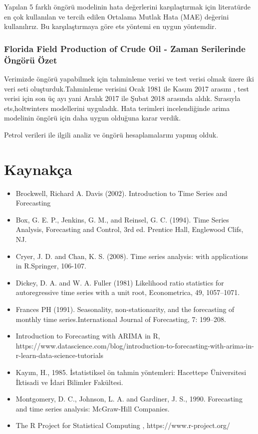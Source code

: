 \documentclass[11pt]{article}
\providecommand{\tightlist}{%
      \setlength{\itemsep}{0pt}\setlength{\parskip}{0pt}}
\begin{document}
    
    Yapılan 5 farklı öngörü modelinin hata değerlerini karşılaştırmak için
literatürde en çok kullanılan ve tercih edilen Ortalama Mutlak Hata
(MAE) değerini kullanılırız. Bu karşılaştırmaya göre ets yöntemi en
uygun yöntemdir.

    \subsubsection{Florida Field Production of Crude Oil - Zaman Serilerinde Öngörü Özet}\label{florida-field-production-of-crude-oil---zaman-serilerinde-uxf6nguxf6ruxfc-uxf6zet}

Verimizde öngörü yapabilmek için tahminleme verisi ve test verisi olmak
üzere iki veri seti oluşturduk.Tahminleme verisini Ocak 1981 ile Kasım
2017 arasını , test verisi için son üç ayı yani Aralık 2017 ile Şubat
2018 arasında aldık. Sırasıyla ets,holtwinters modellerini uyguladık. Hata terimleri incelendiğinde arima modelinin öngörü için daha uygun olduğuna karar verdik.

    Petrol verileri ile ilgili analiz ve öngörü hesaplamalarını yapmış olduk.
\pagebreak
    \section{Kaynakça}\label{kaynakuxe7a}

\begin{itemize}
\tightlist
\item
  Brockwell, Richard A. Davis (2002). Introduction to Time Series and
  Forecasting
\item
  Box, G. E. P., Jenkins, G. M., and Reinsel, G. C. (1994). Time Series
  Analysis, Forecasting and Control, 3rd ed. Prentice Hall, Englewood
  Clifs, NJ.
\item
  Cryer, J. D. and Chan, K. S. (2008). Time series analysis: with
  applications in R.Springer, 106-107.
\item
  Dickey, D. A. and W. A. Fuller (1981) Likelihood ratio statistics for
  autoregressive time series with a unit root, Econometrica, 49,
  1057--1071.
\item
  Frances PH (1991). Seasonality, non-stationarity, and the forecasting
  of monthly time series.International Journal of Forecasting, 7:
  199--208.
\item
  Introduction to Forecasting with ARIMA in R,
  https://www.datascience.com/blog/introduction-to-forecasting-with-arima-in-r-learn-data-science-tutorials
\item
  Kayım, H., 1985. İstatistiksel ön tahmin yöntemleri: Hacettepe
  Üniversitesi İktisadi ve İdari Bilimler Fakültesi.
\item
  Montgomery, D. C., Johnson, L. A. and Gardiner, J. S., 1990.
  Forecasting and time series analysis: McGraw-Hill Companies.
\item
  The R Project for Statistical Computing , https://www.r-project.org/
\end{itemize}


    
    
    
    
\end{document}
